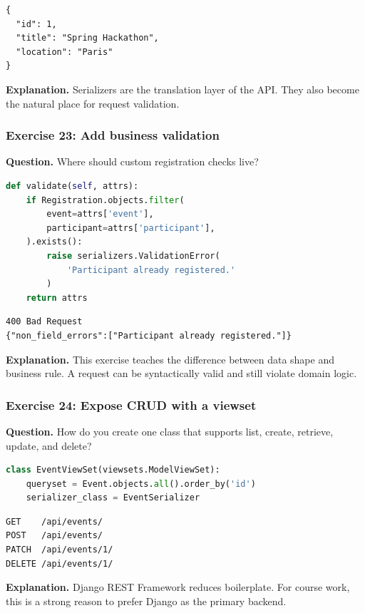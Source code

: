 \documentclass[11pt,a4paper]{article}
\begin{document}
\begin{lstlisting}[style=terminal]
{
  "id": 1,
  "title": "Spring Hackathon",
  "location": "Paris"
}
\end{lstlisting}

\textbf{Explanation.} Serializers are the translation layer of the API. They also become the natural place for request validation.

\subsubsection*{Exercise 23: Add business validation}
\textbf{Question.} Where should custom registration checks live?

\begin{lstlisting}[style=code, language=Python]
def validate(self, attrs):
    if Registration.objects.filter(
        event=attrs['event'],
        participant=attrs['participant'],
    ).exists():
        raise serializers.ValidationError(
            'Participant already registered.'
        )
    return attrs
\end{lstlisting}

\begin{lstlisting}[style=terminal]
400 Bad Request
{"non_field_errors":["Participant already registered."]}
\end{lstlisting}

\textbf{Explanation.} This exercise teaches the difference between data shape and business rule. A request can be syntactically valid and still violate domain logic.

\subsubsection*{Exercise 24: Expose CRUD with a viewset}
\textbf{Question.} How do you create one class that supports list, create, retrieve, update, and delete?

\begin{lstlisting}[style=code, language=Python]
class EventViewSet(viewsets.ModelViewSet):
    queryset = Event.objects.all().order_by('id')
    serializer_class = EventSerializer
\end{lstlisting}

\begin{lstlisting}[style=terminal]
GET    /api/events/
POST   /api/events/
PATCH  /api/events/1/
DELETE /api/events/1/
\end{lstlisting}

\textbf{Explanation.} Django REST Framework reduces boilerplate. For course work, this is a strong reason to prefer Django as the primary backend.
\end{document}
